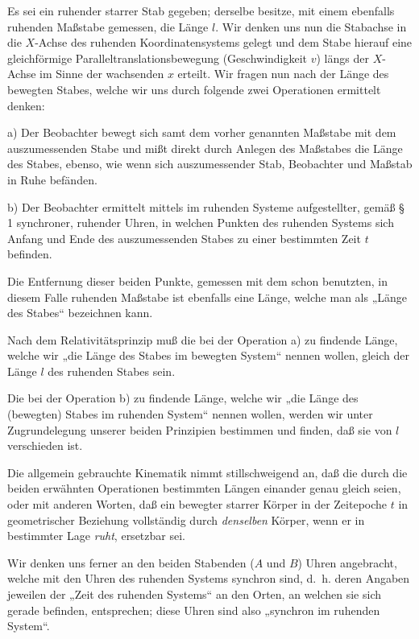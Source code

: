 \documentclass[17pt]{webarticle}       %
\begin{document}
Es sei ein ruhender starrer Stab gegeben; derselbe besitze, mit einem ebenfalls ruhenden Maßstabe gemessen, die Länge \( l \). Wir denken uns nun die Stabachse in die \( X \)-Achse des ruhenden Koordinatensystems gelegt und dem Stabe hierauf eine gleichförmige Paralleltranslationsbewegung (Geschwindigkeit \( v \)) längs der \( X \)-Achse im Sinne der wachsenden \( x \) erteilt. Wir fragen nun nach der Länge des bewegten Stabes, welche wir uns durch folgende zwei Operationen ermittelt denken:

a) Der Beobachter bewegt sich samt dem vorher genannten Maßstabe mit dem auszumessenden Stabe und mißt direkt durch Anlegen des Maßstabes die Länge des Stabes, ebenso, wie wenn sich auszumessender Stab, Beobachter und Maßstab in Ruhe befänden.

b) Der Beobachter ermittelt mittels im ruhenden Systeme aufgestellter, gemäß § 1 synchroner, ruhender Uhren, in welchen Punkten des ruhenden Systems sich Anfang und Ende des auszumessenden Stabes zu einer bestimmten Zeit \( t \) befinden.

Die Entfernung dieser beiden Punkte, gemessen mit dem schon benutzten, in diesem Falle ruhenden Maßstabe ist ebenfalls eine Länge, welche man als „Länge des Stabes“ bezeichnen kann.

Nach dem Relativitätsprinzip muß die bei der Operation a) zu findende Länge, welche wir „die Länge des Stabes im bewegten System“ nennen wollen, gleich der Länge \( l \) des ruhenden Stabes sein.

Die bei der Operation b) zu findende Länge, welche wir „die Länge des (bewegten) Stabes im ruhenden System“ nennen wollen, werden wir unter Zugrundelegung unserer beiden Prinzipien bestimmen und finden, daß sie von \( l \) verschieden ist.

Die allgemein gebrauchte Kinematik nimmt stillschweigend an, daß die durch die beiden erwähnten Operationen bestimmten Längen einander genau gleich seien, oder mit anderen Worten, daß ein bewegter starrer Körper in der Zeitepoche \( t \) in geometrischer Beziehung vollständig durch \emph{denselben} Körper, wenn er in bestimmter Lage \emph{ruht}, ersetzbar sei.

Wir denken uns ferner an den beiden Stabenden (\( A \) und \( B \)) Uhren angebracht, welche mit den Uhren des ruhenden Systems synchron sind, d.~h. deren Angaben jeweilen der „Zeit des ruhenden Systems“ an den Orten, an welchen sie sich gerade befinden, entsprechen; diese Uhren sind also „synchron im ruhenden System“.
\end{document}

